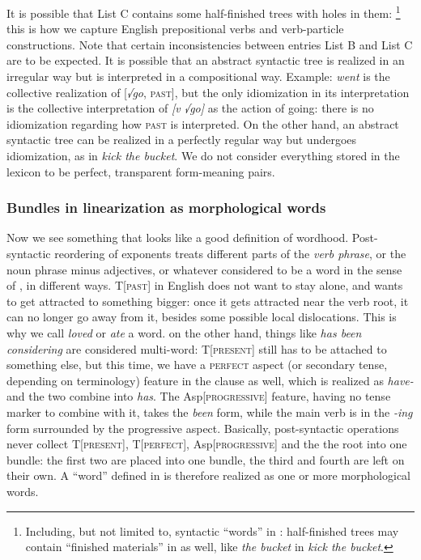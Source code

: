 \documentclass[a4paper, oneside, scheme=plain, 12pt]{article}
\newcommand*{\term}[1]{\emph{#1}}
\newcommand{\form}[1]{\emph{#1}}
\newcommand*{\category}[1]{\textsc{#1}}
\begin{document}
It is possible that List C contains some half-finished trees with holes in them:%
\footnote{
    Including, but not limited to, syntactic ``words'' in :
    half-finished trees may contain ``finished materials'' in  as well,
    like \form{the bucket} in \form{kick the bucket}.
}
this is how we capture English prepositional verbs and verb-particle constructions.
Note that certain inconsistencies between entries List B and List C are to be expected.
It is possible that an abstract syntactic tree is realized in an irregular way but is interpreted in a compositional way.
Example: \form{went} is the collective realization of [\form{√go}, \category{past}],
but the only idiomization in its interpretation is the collective interpretation of \form{[v √go]}
as the action of going:
there is no idiomization regarding how \category{past} is interpreted.
On the other hand, an abstract syntactic tree can be realized in a perfectly regular way
but undergoes idiomization, as in \form{kick the bucket}.
We do not consider everything stored in the lexicon to be perfect, transparent form-meaning pairs.

\subsubsection{Bundles in linearization as morphological words}\label{sec:morphological-wordhood-production}

Now we see something that looks like a good definition of wordhood.
Post-syntactic reordering of exponents treats different parts of the \term{verb phrase},
or the noun phrase minus adjectives, or whatever considered to be a word in the sense of , in different ways.
T[\category{past}] in English does not want to stay alone,
and wants to get attracted to something bigger:
once it gets attracted near the verb root,
it can no longer go away from it, besides some possible local dislocations.
This is why we call \form{loved} or \form{ate} a word.
on the other hand, things like \form{has been considering} are considered multi-word:
T[\category{present}] still has to be attached to something else,
but this time, we have a \category{perfect} aspect (or secondary tense, depending on terminology) feature in the clause as well,
which is realized as \form{have-} and the two combine into \form{has}.
The Asp[\category{progressive}] feature, having no tense marker to combine with it,
takes the \form{been} form, while the main verb is in the \form{-ing} form surrounded by the progressive aspect.
Basically, post-syntactic operations never collect T[\category{present}], T[\category{perfect}], Asp[\category{progressive}] and the the root into one bundle:
the first two are placed into one bundle, the third and fourth are left on their own.
A ``word'' defined in 
is therefore realized as one or more morphological words.
\end{document}

